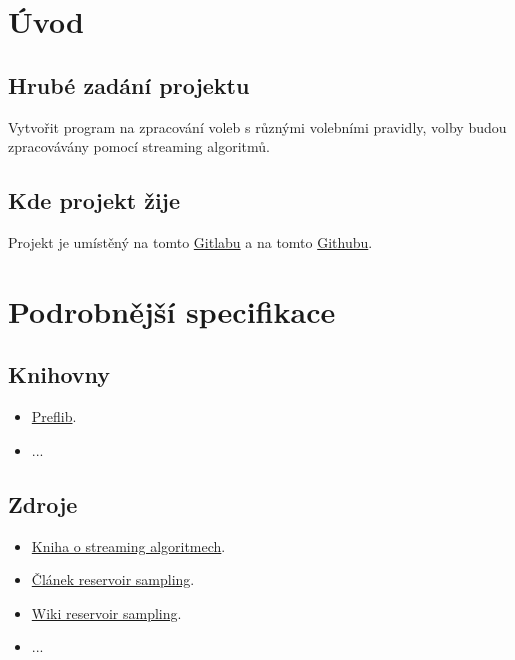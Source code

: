\documentclass[a4paper,12pt]{report}
\begin{document}
	\pagestyle{toc}
	\tableofcontents
	\cleardoublepage
	\pagestyle{plain}
	\pagebreak
	
	\chapter{Úvod}
	
	\section{Hrubé zadání projektu}
	
	Vytvořit program na zpracování voleb s různými volebními pravidly, volby budou zpracovávány pomocí streaming algoritmů.
	
	\section{Kde projekt žije}
	
	Projekt je umístěný na tomto \href{https://gitlab.com/adam_b3n3s/vote_streams}{Gitlabu} a na tomto \href{https://github.com/AdamBenes3/vote_streams}{Githubu}.
	
	\chapter{Podrobnější specifikace}
	
	\section{Knihovny}
	
	\begin{itemize}
		\item \href{https://github.com/PrefLib}{Preflib}.
		\item ...
	\end{itemize}
	
	\section{Zdroje}
	
	\begin{itemize}
		\item \href{http://dimacs.rutgers.edu/~graham/ssbd.html}{Kniha o streaming algoritmech}.
		\item \href{https://dl.acm.org/doi/pdf/10.1145/198429.198435 }{Článek reservoir sampling}.
		\item \href{https://en.wikipedia.org/wiki/Reservoir_sampling}{Wiki reservoir sampling}.
		\item ...
	\end{itemize}
	
\end{document}
